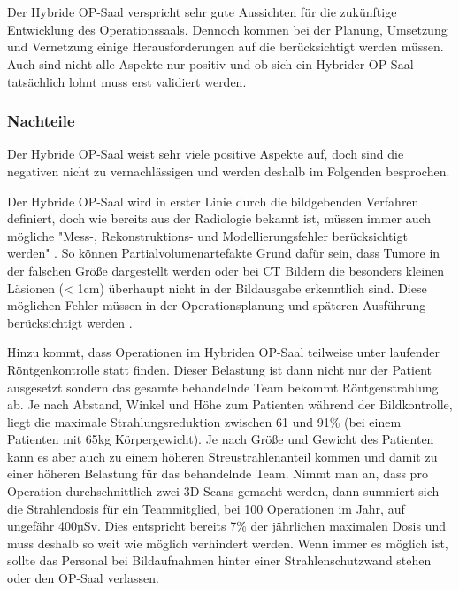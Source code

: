 \chapter{}
\label{sec:overview}

Der Hybride OP-Saal verspricht sehr gute Aussichten für die zukünftige Entwicklung des Operationssaals. Dennoch kommen bei der Planung, Umsetzung und Vernetzung einige Herausforderungen auf die berücksichtigt werden müssen. 
Auch sind nicht alle Aspekte nur positiv und ob sich ein Hybrider OP-Saal tatsächlich lohnt muss erst validiert werden.

\subsection{Nachteile}

Der Hybride OP-Saal weist sehr viele positive Aspekte auf, doch sind die negativen nicht zu vernachlässigen und werden deshalb im Folgenden besprochen.

Der Hybride OP-Saal wird in erster Linie durch die bildgebenden Verfahren definiert, doch wie bereits aus der Radiologie bekannt ist, müssen immer auch mögliche "Mess-, Rekonstruktions- und Modellierungsfehler berücksichtigt werden" \cite{DerDigitaleOperationssaal}. 
So können Partialvolumenartefakte Grund dafür sein, dass Tumore in der falschen Größe dargestellt werden oder bei CT Bildern die besonders kleinen Läsionen (< 1cm) überhaupt nicht in der Bildausgabe erkenntlich sind. Diese möglichen Fehler müssen in der Operationsplanung und späteren Ausführung berücksichtigt werden \cite{DerDigitaleOperationssaal}.

Hinzu kommt, dass Operationen im Hybriden OP-Saal teilweise unter laufender Röntgenkontrolle statt finden. Dieser Belastung ist dann nicht nur der Patient ausgesetzt sondern das gesamte behandelnde Team bekommt Röntgenstrahlung ab. Je nach Abstand, Winkel und Höhe zum Patienten während der Bildkontrolle, liegt die maximale Strahlungsreduktion zwischen 61 und 91\% (bei einem Patienten mit 65kg Körpergewicht). Je nach Größe und Gewicht des Patienten kann es aber auch zu einem höheren Streustrahlenanteil kommen und damit zu einer höheren Belastung für das behandelnde Team.
Nimmt man an, dass pro Operation durchschnittlich zwei 3D Scans gemacht werden, dann summiert sich die Strahlendosis für ein Teammitglied, bei 100 Operationen im Jahr, auf ungefähr 400µSv. Dies entspricht bereits 7\% der jährlichen maximalen Dosis und muss deshalb so weit wie möglich verhindert werden. Wenn immer es möglich ist, sollte das Personal bei Bildaufnahmen hinter einer Strahlenschutzwand stehen oder den OP-Saal verlassen\cite{RadiationExposure}.

